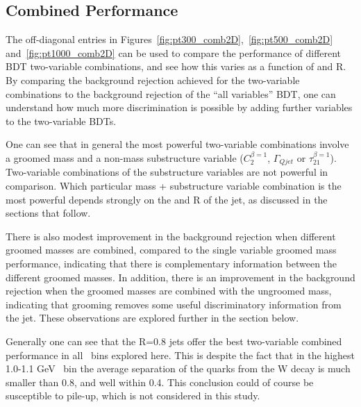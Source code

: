 \subsection{Combined Performance}

The off-diagonal entries in Figures~\ref{fig:pt300_comb2D},~\ref{fig:pt500_comb2D}
and~\ref{fig:pt1000_comb2D} can be used to compare the performance
of different BDT two-variable combinations, and see how this varies as
a function of \pt and R. By comparing the background rejection
achieved for the two-variable combinations to the background rejection
of the ``all variables'' BDT, one can understand how much more
discrimination is possible by adding further variables to the
two-variable BDTs.

One can see that in general the most powerful two-variable
combinations involve a groomed mass and a non-mass substructure
variable ($C_2^{\beta=1}$, $\Gamma_{Qjet}$ or
$\tau_{21}^{\beta=1}$). Two-variable combinations of the substructure
variables are not powerful in comparison.  Which particular mass +
substructure variable combination is the most
powerful depends strongly on the \pt and R of the jet, as discussed
in the sections that follow. 


There is also modest improvement in
the background rejection when different groomed masses are combined,
compared to the single variable groomed mass performance, indicating that there is complementary information between the
different groomed masses. In addition, there is an improvement in the
background rejection when the groomed masses are combined with the
ungroomed mass, indicating that grooming removes some useful
discriminatory information from the jet. These observations are
explored further in the section below.

Generally one can see that the R=0.8 jets offer the best two-variable
combined performance in all \pt~bins explored here. This is despite
the fact that in the highest 1.0-1.1 GeV \pt~bin the average
separation of the quarks from the W decay is much smaller than 0.8,
and well within 0.4. This conclusion could of course be susceptible to
pile-up, which is not considered in this study.


